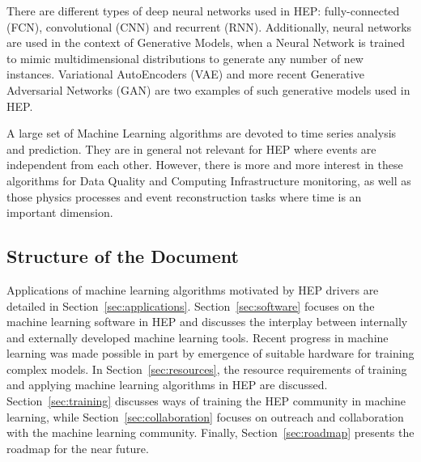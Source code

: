 There are different types of deep neural networks used in HEP: fully-connected (FCN), convolutional (CNN) and recurrent (RNN). Additionally, neural networks are used in the context of Generative Models, when a Neural Network is trained to mimic multidimensional distributions to generate any number of new instances. Variational AutoEncoders (VAE) and more recent Generative Adversarial Networks (GAN) are two examples of such generative models used in HEP.

A large set of Machine Learning algorithms are devoted to time series analysis and prediction. They are in general not relevant for HEP where events are independent from each other. However, there is more and more interest in these algorithms for Data Quality and Computing Infrastructure monitoring, as well as those physics processes and event reconstruction tasks where time is an important dimension.


\subsection{Structure of the Document}


Applications of machine learning algorithms motivated by HEP drivers are detailed in Section~\ref{sec:applications}. Section~\ref{sec:software} focuses on the machine learning software in HEP and discusses the interplay between internally and externally developed machine learning tools. Recent progress in machine learning was made possible in part by emergence of suitable hardware for training complex models. In Section~\ref{sec:resources}, the resource requirements of training and applying machine learning algorithms in HEP are discussed. Section~\ref{sec:training} discusses ways of training the HEP community in machine learning, while Section~\ref{sec:collaboration} focuses on outreach and collaboration with the machine learning community. Finally, Section~\ref{sec:roadmap} presents the roadmap for the near future.


